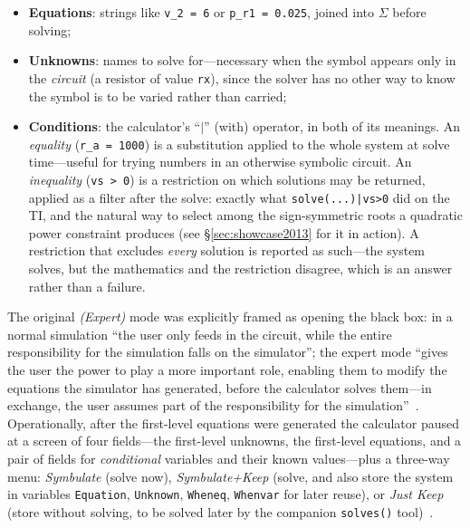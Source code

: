 \documentclass[11pt,oneside]{report}
\newcommand{\code}[1]{\texttt{#1}}
\begin{document}
\begin{itemize}
\item \textbf{Equations}: strings like \code{v\_2 = 6} or
  \code{p\_r1 = 0.025}, joined into $\Sigma$ before solving;
\item \textbf{Unknowns}: names to solve for---necessary when the
  symbol appears only in the \emph{circuit} (a resistor of value
  \code{rx}), since the solver has no other way to know the symbol is
  to be varied rather than carried;
\item \textbf{Conditions}: the calculator's ``$|$'' (with) operator,
  in both of its meanings. An \emph{equality} (\code{r\_a = 1000}) is
  a substitution applied to the whole system at solve time---useful
  for trying numbers in an otherwise symbolic circuit. An
  \emph{inequality} (\code{vs > 0}) is a restriction on which
  solutions may be returned, applied as a filter after the solve:
  exactly what \code{solve(...)|vs>0} did on the TI, and the natural
  way to select among the sign-symmetric roots a quadratic power
  constraint produces (see \S\ref{sec:showcase2013} for it in
  action). A restriction that excludes \emph{every} solution is
  reported as such---the system solves, but the mathematics and the
  restriction disagree, which is an answer rather than a failure.
\end{itemize}

The original \emph{(Expert)} mode was explicitly framed as opening
the black box: in a normal simulation ``the user only feeds in the
circuit, while the entire responsibility for the simulation falls on
the simulator''; the expert mode ``gives the user the power to play
a more important role, enabling them to modify the equations the
simulator has generated, before the calculator solves them---in
exchange, the user assumes part of the responsibility for the
simulation''~\cite[\S4.1]{thesis2000}. Operationally, after the
first-level equations were generated the calculator paused at a
screen of four fields---the first-level unknowns, the first-level
equations, and a pair of fields for \emph{conditional} variables and
their known values---plus a three-way menu: \emph{Symbulate} (solve
now), \emph{Symbulate+Keep} (solve, and also store the system in
variables \code{Equation}, \code{Unknown}, \code{Wheneq},
\code{Whenvar} for later reuse), or \emph{Just Keep} (store without
solving, to be solved later by the companion \code{solves()}
tool)~\cite[\S4.2.8--4.2.11]{thesis2000}.
\end{document}
